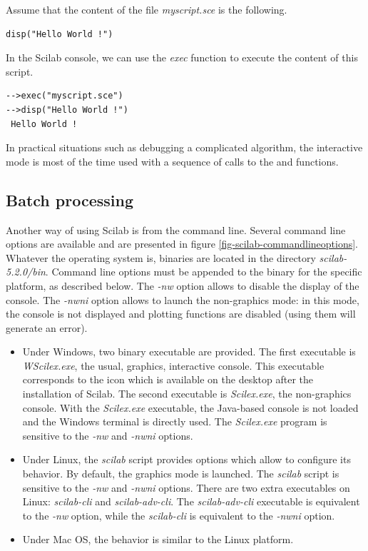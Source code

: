 Assume that the content of the file \emph{myscript.sce} is 
the following.
\lstset{language=scilabscript}
\begin{verbatim}
disp("Hello World !")
\end{verbatim}

In the Scilab console, we can use the \emph{exec} function 
to execute the content of this script.
\lstset{language=scilabscript}
\begin{lstlisting}
-->exec("myscript.sce")
-->disp("Hello World !")
 Hello World !   
\end{lstlisting}

In practical situations such as debugging a complicated algorithm, 
the interactive mode is most of the time used with a sequence 
of calls to the  and  functions.

\subsection{Batch processing}
Another way of using Scilab is from the command line. 
Several command line options are available and are presented in 
figure \ref{fig-scilab-commandlineoptions}. 
Whatever the operating system is, binaries are located in the directory 
\emph{scilab-5.2.0/bin}.
Command line options must be appended to the binary for 
the specific platform, as described below.
The \emph{-nw} option allows to disable the display of the console. 
The \emph{-nwni} option allows to launch the non-graphics mode: in this mode, the console 
is not displayed and plotting functions are disabled (using them will generate an 
error).

\begin{itemize}
\item Under Windows, two binary executable are provided. The first executable is \emph{WScilex.exe}, 
the usual, graphics, interactive console. This executable corresponds to 
the icon which is available on the desktop after the installation of Scilab.
The second executable is \emph{Scilex.exe}, the non-graphics console. With the 
\emph{Scilex.exe} executable, the Java-based console is not loaded and the Windows terminal 
is directly used. The \emph{Scilex.exe} program is sensitive to the \emph{-nw}
and \emph{-nwni} options.

\item Under Linux, the \emph{scilab} script provides options which 
allow to configure its behavior. By default, the graphics mode is 
launched. The \emph{scilab} script is sensitive to the \emph{-nw}
and \emph{-nwni} options.
There are two extra executables on Linux: \emph{scilab-cli} and \emph{scilab-adv-cli}.
The \emph{scilab-adv-cli} executable is equivalent to the \emph{-nw} option,
while the \emph{scilab-cli} is equivalent to the \emph{-nwni} option\cite{WikiNwniWWW}.

\item Under Mac OS, the behavior is similar to the Linux platform.
\end{itemize}

